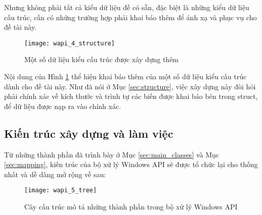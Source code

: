 Nhưng không phải tất cả kiểu dữ liệu đề có sẵn, đặc biệt là những kiểu dữ liệu cấu trúc, cần có những trường hợp phải khai báo thêm để ánh xạ và phục vụ cho đề tài này.

	\begin{figure}[H]
	\centering
		\texttt{[image: wapi\_4\_structure]}
		\caption{Một số dữ liệu kiểu cấu trúc được xây dựng thêm}	
		\label{fig:wapi_4_structure}		
	\end{figure}

Nội dung của Hình \ref{fig:wapi_4_structure} thể hiện khai báo thêm của một số dữ liệu kiểu cấu trúc dành cho đề tài này. Như đã nói ở Mục \ref{sec:structure}, việc xây dựng này đòi hỏi phải chính xác về kích thước và trình tự các biến được khai báo bên trong struct, để dữ liệu được nạp ra vào chính xác.

	\subsection{Kiến trúc xây dựng và làm việc}

Từ những thành phần đã trình bày ở Mục \ref{sec:main_classes} và Mục \ref{sec:mapping}, kiến trúc của bộ xử lý Windows API sẽ được tổ chức lại cho thống nhất và dễ dàng mở rộng về sau:

	\begin{figure}[H]
	\centering
		\texttt{[image: wapi\_5\_tree]}
		\caption{Cây cấu trúc mô tả những thành phần trong bộ xử lý Windows API}	
		\label{fig:wapi_5_tree}		
	\end{figure}

